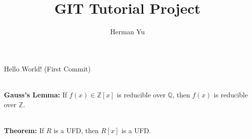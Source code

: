 \documentclass[12pt]{article}
\begin{document}
\title{GIT Tutorial Project}
\date{}
\author{Herman Yu}
\maketitle

Hello World! (First Commit)\par 
\hfill \\
\textbf{Gauss's Lemma:} If $f(x)\in \mathbb{Z}[x]$ is reducible over $\mathbb{Q}$, then $f(x)$ is reducible over $\mathbb{Z}$.\par 
\hfill \\
\textbf{Theorem:} If $R$ is a UFD, then $R[x]$ is a UFD.\par 
\end{document}
